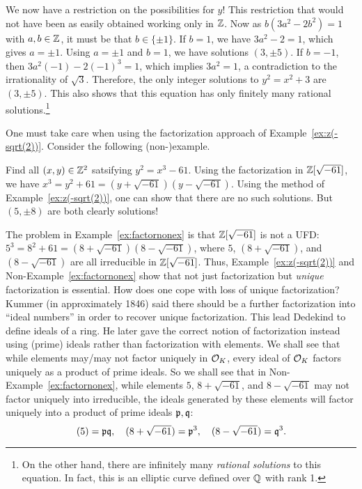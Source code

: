 \begin{ex}
We now have a restriction on the possibilities for $y$! This restriction that would not have been as easily obtained working only in $\mathbb{Z}$. Now as $b (3a^2 - 2b^2)= 1$ with $a, b \in \mathbb{Z}$, it must be that $b \in \{\pm 1\}$. If $b= 1$, we have $3a^2 - 2= 1$, which gives $a= \pm 1$. Using $a= \pm 1$ and $b=1$, we have solutions $(3, \pm 5)$. If $b= -1$, then $3a^2(-1)-2(-1)^3=1$, which implies $3a^2=1$, a contradiction to the irrationality of $\sqrt{3}$. Therefore, the only integer solutions to $y^2= x^2 + 3$ are $(3, \pm 5)$. This also shows that this equation has only finitely many rational solutions.\footnote{On the other hand, there are infinitely many \emph{rational solutions} to this equation. In fact, this is an elliptic curve defined over $\mathbb{Q}$ with rank 1.} \xqed \pskip
\end{ex}


One must take care when using the factorization approach of Example~\ref{ex:z(-sqrt(2))}. Consider the following (non-)example. 


\begin{nex}\label{ex:factornonex}
Find all $(x,y) \in \mathbb{Z}^2$ satsifying $y^2=x^3-61$. Using the factorization in $\mathbb{Z}[\sqrt{-61}]$, we have $x^3=y^2+61=(y+\sqrt{-61})(y-\sqrt{-61})$. Using the method of Example~\ref{ex:z(-sqrt(2))}, one can show that there are no such solutions. But $(5, \pm 8)$ are both clearly solutions! \xqed \pskip
\end{nex}


The problem in Example~\ref{ex:factornonex} is that $\mathbb{Z}[\sqrt{-61}]$ is not a UFD: $5^3=8^2+61=(8+\sqrt{-61})(8-\sqrt{-61})$, where $5$, $(8+\sqrt{-61})$, and $(8-\sqrt{-61})$ are all irreducible in $\mathbb{Z}[\sqrt{-61}]$. Thus, Example~\ref{ex:z(-sqrt(2))} and Non-Example~\ref{ex:factornonex} show that not just factorization but \emph{unique} factorization is essential.  How does one cope with loss of unique factorization? Kummer (in approximately 1846) said there should be a further factorization into ``ideal numbers'' in order to recover unique factorization. This lead Dedekind to define ideals of a ring. He later gave the correct notion of factorization instead using (prime) ideals rather than factorization with elements. We shall see that while elements may/may not factor uniquely in $\mathcal{O}_K$, every ideal of $\mathcal{O}_K$ factors uniquely as a product of prime ideals. So we shall see that in Non-Example~\ref{ex:factornonex}, while elements $5$, $8 + \sqrt{-61}$, and $8 - \sqrt{-61}$ may not factor uniquely into irreducible, the ideals generated by these elements will factor uniquely into a product of prime ideals $\mathfrak{p}, \mathfrak{q}$:
	\[
	(5)= \mathfrak{p} \mathfrak{q}, \quad (8 + \sqrt{-61})= \mathfrak{p}^3, \quad (8 - \sqrt{-61})= \mathfrak{q}^3. 
	\]


